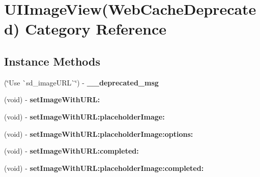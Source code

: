 \hypertarget{category_u_i_image_view_07_web_cache_deprecated_08}{}\section{U\+I\+Image\+View(Web\+Cache\+Deprecated) Category Reference}
\label{category_u_i_image_view_07_web_cache_deprecated_08}
\subsection*{Instance Methods}
\begin{DoxyCompactItemize}
\item 
\mbox{\label{category_u_i_image_view_07_web_cache_deprecated_08_abce1b9f769f99947aa3b2829fb1a977a}} 
(\char`\"{}Use \`{}sd\+\_\+image\+U\+RL\`{}\char`\"{}) -\/ {\bfseries \+\_\+\+\_\+deprecated\+\_\+msg}
\item 
\mbox{\label{category_u_i_image_view_07_web_cache_deprecated_08_ab266b5f32655763bcc040d89fde5515f}} 
(void) -\/ {\bfseries set\+Image\+With\+U\+R\+L\+:}
\item 
\mbox{\label{category_u_i_image_view_07_web_cache_deprecated_08_aa8fe46f136bc683f2b9a1774f3b14c1e}} 
(void) -\/ {\bfseries set\+Image\+With\+U\+R\+L\+:placeholder\+Image\+:}
\item 
\mbox{\label{category_u_i_image_view_07_web_cache_deprecated_08_a64439251752a3e6d05ea0048f890de20}} 
(void) -\/ {\bfseries set\+Image\+With\+U\+R\+L\+:placeholder\+Image\+:options\+:}
\item 
\mbox{\label{category_u_i_image_view_07_web_cache_deprecated_08_ae63378d5e281f75357307ae22b214288}} 
(void) -\/ {\bfseries set\+Image\+With\+U\+R\+L\+:completed\+:}
\item 
\mbox{\label{category_u_i_image_view_07_web_cache_deprecated_08_abe4ed894259f4e7c6e67075befcd23c8}} 
(void) -\/ {\bfseries set\+Image\+With\+U\+R\+L\+:placeholder\+Image\+:completed\+:}

\end{DoxyCompactItemize}
